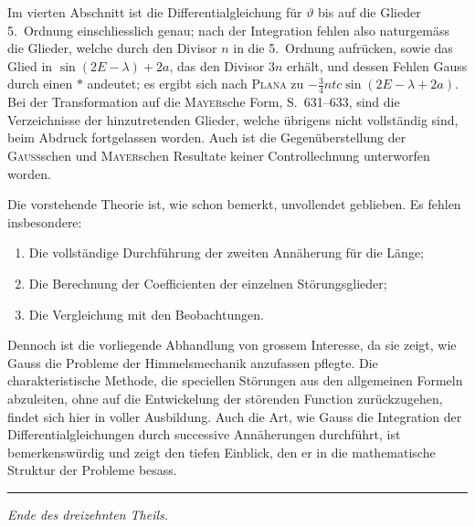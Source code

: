 \documentclass[10pt,a4paper]{article}
\begin{document}
Im vierten Abschnitt ist die Differentialgleichung f\"ur $\vartheta$ bis auf die Glieder 5.~Ordnung einschliesslich genau; nach der Integration fehlen also naturgem\"ass die Glieder, welche durch den Divisor $n$ in die 5.~Ordnung aufr\"ucken, sowie das Glied in $\sin(2E - \lambda) + 2a$, das den Divisor $3n$ erh\"alt, und dessen Fehlen Gauss durch einen $\ast$ andeutet; es ergibt sich nach\textsc{ Plana} zu $-\frac{3}{4}ntc\sin(2E - \lambda + 2a)$. Bei der Transformation auf die\textsc{ Mayer}sche Form, S.~631--633, sind die Verzeichnisse der hinzutretenden Glieder, welche \"ubrigens nicht vollst\"andig sind, beim Abdruck fortgelassen worden. Auch ist die Gegen\"uberstellung der \textsc{Gauss}schen und\textsc{ Mayer}schen Resultate keiner Controllechnung unterworfen worden.

\newpage
\noindent
Die vorstehende Theorie ist, wie schon bemerkt, unvollendet geblieben. Es fehlen insbesondere:
\begin{enumerate}[label=\arabic*.]
\item Die vollst\"andige Durchf\"uhrung der zweiten Ann\"aherung f\"ur die L\"ange;
\item Die Berechnung der Coefficienten der einzelnen St\"orungsglieder;
\item Die Vergleichung mit den Beobachtungen.
\end{enumerate}

Dennoch ist die vorliegende Abhandlung von grossem Interesse, da sie zeigt, wie Gauss die Probleme der Himmelsmechanik anzufassen pflegte. Die charakteristische Methode, die speciellen St\"orungen aus den allgemeinen Formeln abzuleiten, ohne auf die Entwickelung der st\"orenden Function zur\"uckzugehen, findet sich hier in voller Ausbildung. Auch die Art, wie Gauss die Integration der Differentialgleichungen durch successive Ann\"aherungen durchf\"uhrt, ist bemerkensw\"urdig und zeigt den tiefen Einblick, den er in die mathematische Struktur der Probleme besass.

\bigskip
\noindent\rule{\textwidth}{0.4pt}

\bigskip
\noindent\textit{Ende des dreizehnten Theils.}
\end{document}
